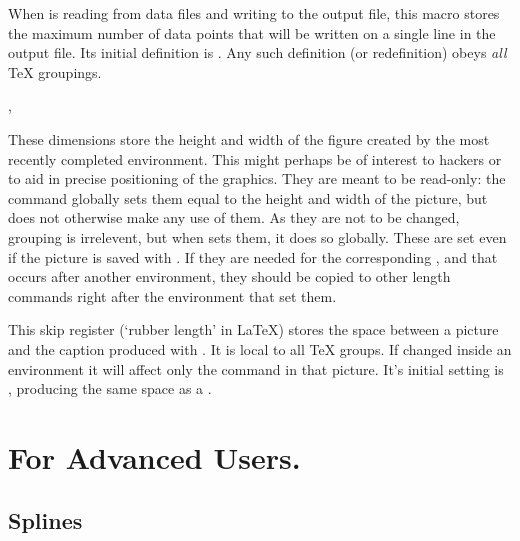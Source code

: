 \documentclass[letterpaper]{article}
\begin{document}
When \mfp{} is reading from data files and writing to the output file,
this macro stores the maximum number of data points that will be written
on a single line in the output file. Its initial definition is
. Any such definition (or
redefinition) obeys \emph{all} \TeX{} groupings.

\begin{cd}
, %
%
\end{cd}

These dimensions store the height and width of the figure created by the
most recently completed  environment. This might perhaps be
of interest to hackers or to aid in precise positioning of the graphics.
They are meant to be read-only: the  command globally sets
them equal to the height and width of the picture, but \mfp{} does not
otherwise make any use of them. As they are not to be changed, grouping
is irrelevent, but when \mfp{} sets them, it does so globally. These are
set even if the picture is saved with . If they are needed
for the corresponding , and that occurs after another
 environment, they should be copied to other length commands
right after the  environment that set them.

\begin{cd}
%
\end{cd}

This skip register (`rubber length' in \LaTeX) stores the space between
a picture and the caption produced with . It is local to
all \TeX{} groups. If changed inside an  environment it will
affect only the  command in that picture. It's initial
setting is , producing the same space as a
.


\section{For Advanced Users.}\label{advanced}

\subsection{Splines}\label{splines}

\begin{cd}
\\
\\
\\
%
%
%
%
%
\end{cd}
\end{document}
